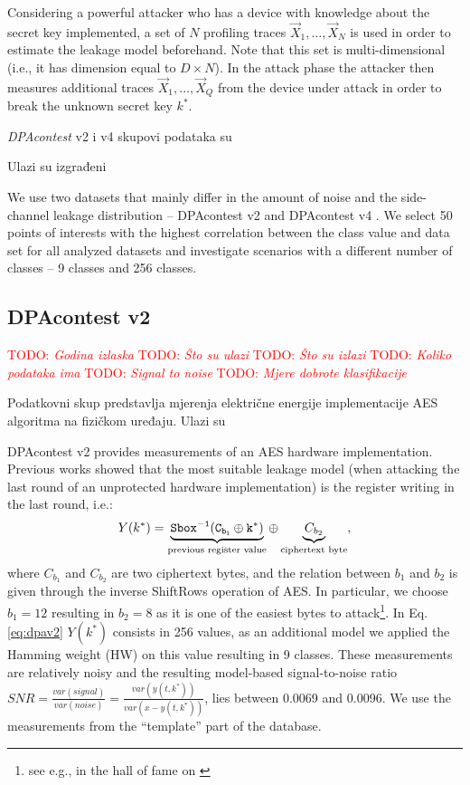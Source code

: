 \documentclass[times, utf8, numeric, diplomski]{fer}
\def\SBOXi#1{\tt Sbox^{-1}(#1)}
\def\TODO#1{\noindent\textcolor{red}{TODO: \textit{#1}}\newline}
\def\todo#1{\TODO{#1}}
\begin{document}
Considering a powerful attacker who has a device with knowledge about the secret key implemented, a set of $N$ profiling traces $\vec X_1,\ldots,\vec X_{N}$ is used in order to estimate the leakage model beforehand. 
Note that this set is multi-dimensional (i.e., it has dimension equal to $D\times N$).
In the attack phase the attacker then measures additional traces $\vec X_1,\ldots,\vec X_{Q}$ from the device under attack in order to break the unknown secret key $k^*$.

\textit{DPAcontest} v2 i v4 skupovi podataka su 

Ulazi su izgrađeni 

We use two datasets that mainly differ in the amount of noise and the side-channel leakage distribution -- DPAcontest v2 \citep{dpacontestv2} and DPAcontest v4 \citep{dpacontestv4}.
We select 50 points of interests with the highest correlation between the class value and data set for all analyzed datasets and investigate scenarios with a different number of classes -- 9 classes and 256 classes.

\subsection{DPAcontest v2}
\todo{Godina izlaska}
\todo{Što su ulazi}
\todo{Što su izlazi}
\todo{Koliko podataka ima}
\todo{Signal to noise}
\todo{Mjere dobrote klasifikacije}

Podatkovni skup predstavlja mjerenja električne energije implementacije AES algoritma na fizičkom uređaju. Ulazi su 

DPAcontest v2 provides measurements of an AES hardware implementation.
Previous works showed that the most suitable leakage model (when attacking the last round of an unprotected hardware implementation) is the register writing in the last round, i.e.:
\begin{equation}
\label{eq:dpav2}
Y(k^*) = \underbrace{\SBOXi{C_{b_1} \oplus k^*}}_{\text{previous register value}} \oplus \underbrace{C_{b_2}}_{\text{ciphertext byte}},
\end{equation}
where $C_{b_1}$ and $C_{b_2}$ are two ciphertext bytes, and the relation between $b_1$ and $b_2$ is given through the inverse ShiftRows operation of AES.
In particular, we choose $b_1 = 12$ resulting in $b_2 = 8$ as it is one of the easiest bytes to attack\footnote{see e.g., in the hall of fame on \citep{dpacontestv2}}.
%
In Eq. \eqref{eq:dpav2} $Y(k^*)$ consists in 256 values, as an additional model we applied the Hamming weight (HW) on this value resulting in 9 classes.
These measurements are relatively noisy and the resulting model-based signal-to-noise ratio $SNR = \frac{var(signal)}{var(noise)} = \frac{var(y(t,k^*))}{var(x-y(t,k^*))}$, lies between 0.0069 and 0.0096. We use the measurements from the ``template'' part of the database.
\end{document}
